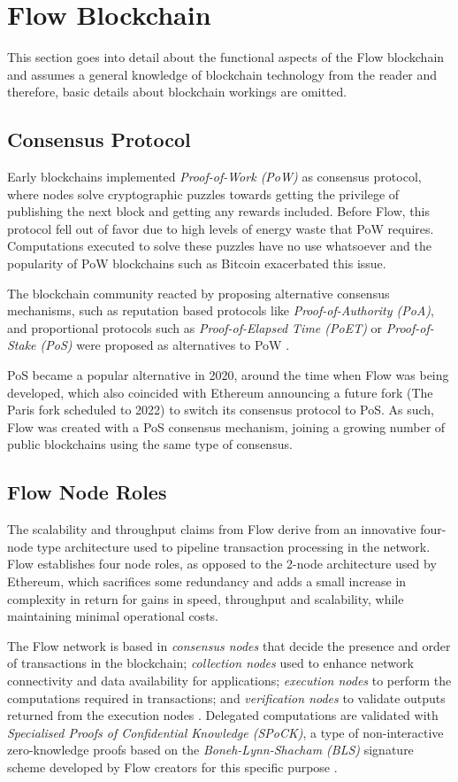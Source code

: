 \documentclass[../NFTComp_IEEE.tex]{subfiles}
\begin{document}
\section{Flow Blockchain}
\label{sec:flow_blockchain}
This section goes into detail about the functional aspects of the Flow blockchain and assumes a general knowledge of blockchain technology from the reader and therefore, basic details about blockchain workings are omitted.
\par
\subsection{Consensus Protocol}
Early blockchains implemented \textit{Proof-of-Work (PoW)} as consensus protocol, where nodes solve cryptographic puzzles towards getting the privilege of publishing the next block and getting any rewards included. Before Flow, this protocol fell out of favor due to high levels of energy waste that PoW requires. Computations executed to solve these puzzles have no use whatsoever and the popularity of PoW blockchains such as Bitcoin exacerbated this issue.
\par
The blockchain community reacted by proposing alternative consensus mechanisms, such as reputation based protocols like \textit{Proof-of-Authority (PoA)}, and proportional protocols such as \textit{Proof-of-Elapsed Time (PoET)} or \textit{Proof-of-Stake (PoS)} were proposed as alternatives to PoW \cite{Bouraga2021}.
\par
PoS became a popular alternative in 2020, around the time when Flow was being developed, which also coincided with Ethereum announcing a future fork (The Paris fork scheduled to 2022) to switch its consensus protocol to PoS. As such, Flow was created with a PoS consensus mechanism, joining a growing number of public blockchains using the same type of consensus.

\subsection{Flow Node Roles}
The scalability and throughput claims from Flow derive from an innovative four-node type architecture used to pipeline transaction processing in the network. Flow establishes four node roles, as opposed to the 2-node architecture used by Ethereum, which sacrifices some redundancy and adds a small increase in complexity in return for gains in speed, throughput and scalability, while maintaining minimal operational costs.
\par
The Flow network is based in \textit{consensus nodes} that decide the presence and order of transactions in the blockchain; \textit{collection nodes} used to enhance network connectivity and data availability for applications; \textit{execution nodes} to perform the computations required in transactions; and \textit{verification nodes} to validate outputs returned from the execution nodes \cite{Hentschel2019b}. Delegated computations are validated with \textit{Specialised Proofs of Confidential Knowledge (SPoCK)}, a type of non-interactive zero-knowledge proofs based on the \textit{Boneh-Lynn-Shacham (BLS)} signature scheme developed by Flow creators for this specific purpose \cite{Ben2020}.
\end{document}
